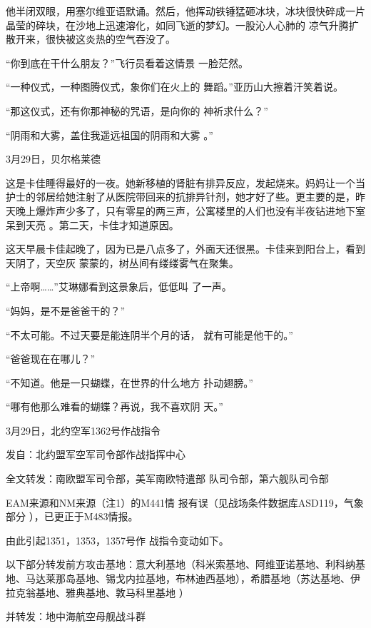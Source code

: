 \documentclass{article}
\begin{document}
他半闭双眼，用塞尔维亚语默诵。然后，他挥动铁锤猛砸冰块，冰块很快碎成一片晶莹的碎块，在沙地上迅速溶化，如同飞逝的梦幻。一股沁人心肺的
凉气升腾扩散开来，很快被这炎热的空气吞没了。 

“你到底在干什么朋友？”飞行员看着这情景
一脸茫然。 

“一种仪式，一种图腾仪式，象你们在火上的
舞蹈。”亚历山大擦着汗笑着说。 

“那这仪式，还有你那神秘的咒语，是向你的
神祈求什么？” 

\newpage

“阴雨和大雾，盖住我遥远祖国的阴雨和大雾
。” 



3月29日，贝尔格莱德 

这是卡佳睡得最好的一夜。她新移植的肾脏有排异反应，发起烧来。妈妈让一个当护士的邻居给她注射了从医院带回来的抗排异针剂，她才好了些。更主要的是，昨天晚上爆炸声少多了，只有零星的两三声，公寓楼里的人们也没有半夜钻进地下室呆到天亮
。第二天，卡佳才知道原因。 

这天早晨卡佳起晚了，因为已是八点多了，外面天还很黑。卡佳来到阳台上，看到天阴了，天空灰
蒙蒙的，树丛间有缕缕雾气在聚集。 

“上帝啊……”艾琳娜看到这景象后，低低叫
了一声。 


\newpage

“妈妈，是不是爸爸干的？” 

“不太可能。不过天要是能连阴半个月的话，
就有可能是他干的。” 


“爸爸现在在哪儿？” 

“不知道。他是一只蝴蝶，在世界的什么地方
扑动翅膀。” 

“哪有他那么难看的蝴蝶？再说，我不喜欢阴
天。” 



3月29日，北约空军1362号作战指令 


发自：北约盟军空军司令部作战指挥中心 

全文转发：南欧盟军司令部，美军南欧特遣部
队司令部，第六舰队司令部 

EAM来源和NM来源（注1）的M441情
\newpage
报有误（见战场条件数据库ASD119，气象部分
），已更正于M483情报。 

由此引起1351，1353，1357号作
战指令变动如下。 

以下部分转发前方攻击基地：意大利基地（科米索基地、阿维亚诺基地、利科纳基地、马达莱那岛基地、锡戈内拉基地，布林迪西基地），希腊基地（苏达基地、伊拉克翁基地、雅典基地、敦马科里基地
） 


并转发：地中海航空母舰战斗群 
\end{document}
